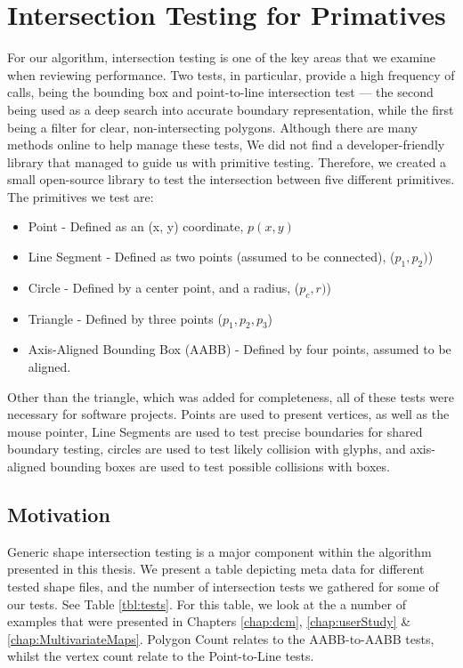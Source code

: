 \section{Intersection Testing for Primatives}
For our algorithm, intersection testing is one of the key areas that we examine when reviewing performance. Two tests, in particular, provide a high frequency of calls, being the bounding box and point-to-line intersection test — the second being used as a deep search into accurate boundary representation, while the first being a filter for clear, non-intersecting polygons. Although there are many methods online to help manage these tests, We did not find a developer-friendly library that managed to guide us with primitive testing. Therefore, we created a small open-source library to test the intersection between five different primitives. The primitives we test are:
\begin{itemize}
\item Point - Defined as an (x, y) coordinate, $p(x,y)$
\item Line Segment - Defined as two points (assumed to be connected), ($p_1,p_2)$)
\item Circle -  Defined by a center point, and a radius, ($p_c,r)$)
\item Triangle - Defined by three points ($p_1,p_2,p_3$)
\item Axis-Aligned Bounding Box (AABB) - Defined by four points, assumed to be aligned.
\end{itemize}

Other than the triangle, which was added for completeness, all of these tests were necessary for software projects. Points are used to present vertices, as well as the mouse pointer, Line Segments are used to test precise boundaries for shared boundary testing, circles are used to test likely collision with glyphs, and axis-aligned bounding boxes are used to test possible collisions with boxes.

\subsection{Motivation}
Generic shape intersection testing is a major component within the algorithm presented in this thesis. We present a table depicting meta data for different tested shape files, and the number of intersection tests we gathered for some of our tests. See Table \ref{tbl:tests}. For this table, we look at the a number of examples that were presented in Chapters \ref{chap:dcm}, \ref{chap:userStudy} \& \ref{chap:MultivariateMaps}. Polygon Count relates to the AABB-to-AABB tests, whilst the vertex count relate to the Point-to-Line tests.

